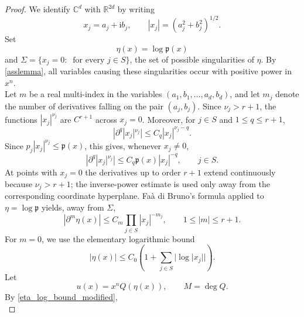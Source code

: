 \documentclass{amsart}
\newcommand{\ri}{\mathrm{i}}
\theoremstyle{plain}
\theoremstyle{definition}
\begin{document}
\begin{proof}
We identify $\mathbb C^d$ with $\mathbb R^{2d}$ by writing
\begin{equation}
        x_j=a_j+\ri b_j,
        \qquad
        |x_j|=(a_j^2+b_j^2)^{1/2}.
\end{equation}
Set
\begin{equation}
        \eta(x)=\log\mathfrak p(x)
\end{equation}
and $\Sigma=\{x_j=0:\ \text{ for every } j\in S\}$, the set of possible singularities of $\eta$. By \eqref{asslemma}, all
variables causing these singularities occur with positive power in $x^n$.\\
Let $m$ be a real multi-index in the variables
$(a_1,b_1,\ldots,a_d,b_d)$, and let $m_j$ denote the number of derivatives falling on
the pair $(a_j,b_j)$. Since $\nu_j>r+1$, the functions $|x_j|^{\nu_j}$ are
$C^{r+1}$ across $x_j=0$. Moreover, for $j\in S$ and $1\leq q\leq r+1$,
\begin{equation}\label{der_power_modified}
        |\partial^q |x_j|^{\nu_j}|
        \le
        C_q |x_j|^{\nu_j-q}.
\end{equation}
Since $p_j |x_j|^{\nu_j}\leq \mathfrak p(x)$, this gives, whenever $x_j\neq0$,
\begin{equation}\label{der_power_rho_modified}
        |\partial^q |x_j|^{\nu_j}|
        \le
        C_q \mathfrak p(x)|x_j|^{-q},
        \qquad j\in S.
\end{equation}
At points with $x_j=0$ the derivatives up to order $r+1$ extend continuously because $\nu_j>r+1$; the inverse-power estimate is used only away from the corresponding coordinate hyperplane.
Faà di Bruno's formula applied to $\eta=\log\mathfrak p$ yields, away from $\Sigma$,
\begin{equation}\label{eta_derivative_bound_modified}
        |\partial^m\eta(x)|
        \le
        C_m\prod_{j\in S}|x_j|^{-m_j},
        \qquad
        1\leq |m|\leq r+1.
\end{equation}
For $m=0$, we use the elementary logarithmic bound
\begin{equation}\label{eta_log_bound_modified}
        |\eta(x)|
        \le
        C_0\left(
        1+\sum_{j\in S}|\log |x_j||
        \right).
\end{equation}
Let
\begin{equation}
        u(x)=x^n Q(\eta(x)),
        \qquad
        M=\deg Q.
\end{equation}
By \eqref{eta_log_bound_modified},
\begin{equation}\label{Q_log_bound_modified}

\end{equation}
\end{proof}
\end{document}
